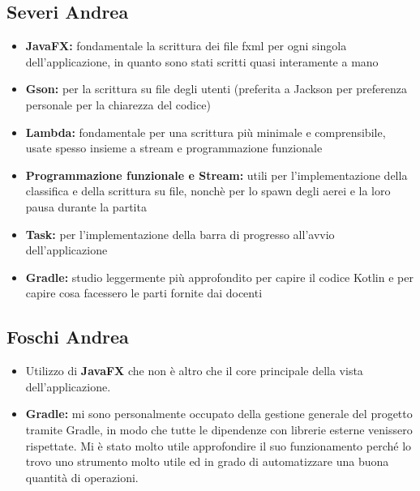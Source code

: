 \documentclass[a4paper,12pt]{report}
\begin{document}
\subsection{Severi Andrea}
\begin{itemize}
    \item \textbf{JavaFX:} fondamentale la scrittura dei file fxml per ogni singola  dell'applicazione, in quanto sono stati scritti quasi interamente a mano
    \item \textbf{Gson:} per la scrittura su file degli utenti (preferita a Jackson per preferenza personale per la chiarezza del codice)
    \item \textbf{Lambda:} fondamentale per una scrittura più minimale e comprensibile, usate spesso insieme a stream e programmazione funzionale
    \item \textbf{Programmazione funzionale e Stream:} utili per l'implementazione della classifica e della scrittura su file, nonchè per lo spawn degli aerei e la loro pausa durante la partita
    \item \textbf{Task:} per l'implementazione della barra di progresso all'avvio dell'applicazione
    \item \textbf{Gradle:} studio leggermente più approfondito per capire il codice Kotlin e per capire cosa facessero le parti fornite dai docenti
\end{itemize}

\subsection{Foschi Andrea}
\begin{itemize}
    \item Utilizzo di \textbf{JavaFX} che non è altro che il core principale della vista dell’applicazione.
    \item \textbf{Gradle:} mi sono personalmente occupato della gestione generale del progetto tramite Gradle, in modo che tutte le dipendenze con librerie esterne venissero rispettate. Mi è stato molto utile approfondire il suo funzionamento perché lo trovo uno strumento molto utile ed in grado di automatizzare una buona quantità di operazioni.
\end{itemize}
\end{document}
